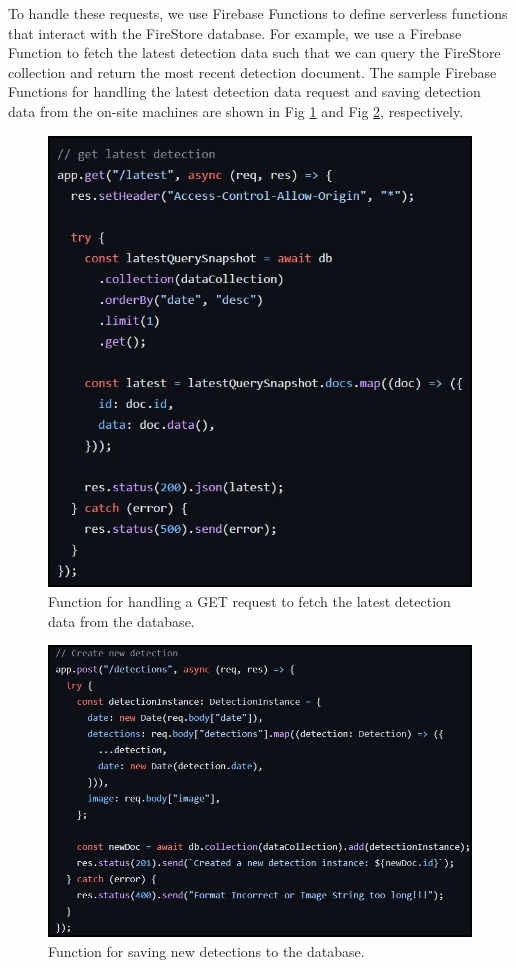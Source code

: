 To handle these requests, we use Firebase Functions to define serverless functions that interact with the FireStore database. For example, we use a Firebase Function to fetch the latest detection data such that we can query the FireStore collection and return the most recent detection document. The sample Firebase Functions for handling the latest detection data request and saving detection data from the on-site machines are shown in Fig \ref{fig:4.5} and Fig \ref{fig:4.6}, respectively.

\begin{figure}[H]
\begin{center}
\includegraphics[width=0.8\linewidth]{Honors_Thesis/Figures/4.5.jpg}
\end{center}
\caption{Function for handling a GET request to fetch the latest detection data from the database.}
\label{fig:4.5}
\end{figure}

\begin{figure}[H]
\begin{center}
\includegraphics[width=1.0\linewidth]{Honors_Thesis/Figures/4.6.jpg}
\end{center}
\caption{Function for saving new detections to the database.}
\label{fig:4.6}
\end{figure}

